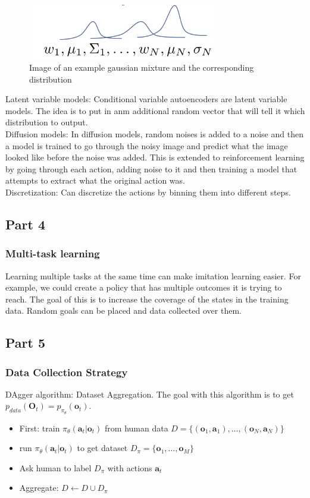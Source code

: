 \begin{figure}[htbp]
  \centerline{\includegraphics[width=0.75\textwidth]{images/lecture2_gaussian_mixture.png}}
  \caption{Image of an example gaussian mixture and the corresponding distribution}
  \label{fig:lecture2_gaussian_mixture}
\end{figure}

Latent variable models: Conditional variable autoencoders are latent variable models. The idea is to put in anm additional random vector that will tell it which distribution to output.
\\ 
Diffusion models: In diffusion models, random noises is added to a noise and then a model is trained to go through the noisy image and predict what the image looked like before the noise was added. This is extended to reinforcement learning by going through each action, adding noise to it and then training a model that attempts to extract what the original action was.
\\
Discretization: Can discretize the actions by binning them into different steps.

\subsection{Part 4}
\subsubsection{Multi-task learning}
Learning multiple tasks at the same time can make imitation learning easier. For example, we could create a policy that has multiple outcomes it is trying to reach. The goal of this is to increase the coverage of the states in the training data. Random goals can be placed and data collected over them.

\subsection{Part 5}
\subsubsection{Data Collection Strategy}
DAgger algorithm: Dataset  Aggregation. The goal with this algorithm is to get $p_{data}(\textbf{O}_t) = p_{\pi_\theta} (\textbf{o}_t)$.
\begin{itemize}
  \item First: train $\pi_\theta (\textbf{a}_t | \textbf{o}_t)$ from human data $D = \{(\textbf{o}_1, \textbf{a}_1), \dots, (\textbf{o}_N, \textbf{a}_N)\}$
  \item run $\pi_\theta (\textbf{a}_t | \textbf{o}_t)$ to get dataset $D_\pi = \{ \textbf{o}_1, \dots, \textbf{o}_M \}$
  \item Ask human to label $D_\pi$ with actions $\textbf{a}_t$
  \item Aggregate: $D \leftarrow D \cup D_\pi $
\end{itemize}

